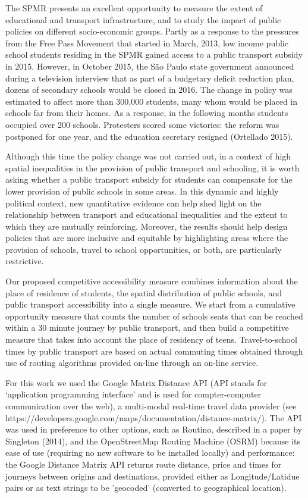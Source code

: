 \documentclass[]{article}
\begin{document}
The SPMR presents an excellent opportunity to measure the extent of
educational and transport infrastructure, and to study the impact of
public policies on different socio-economic groups. Partly as a response
to the pressures from the Free Pass Movement that started in March,
2013, low income public school students residing in the SPMR gained
access to a public transport subsidy in 2015. However, in October 2015,
the São Paulo state government announced during a television interview
that as part of a budgetary deficit reduction plan, dozens of secondary
schools would be closed in 2016. The change in policy was estimated to
affect more than 300,000 students, many whom would be placed in schools
far from their homes. As a response, in the following months students
occupied over 200 schools. Protesters scored some victories: the reform
was postponed for one year, and the education secretary resigned
(Ortellado 2015).

Although this time the policy change was not carried out, in a context
of high spatial inequalities in the provision of public transport and
schooling, it is worth asking whether a public transport subsidy for
students can compensate for the lower provision of public schools in
some areas. In this dynamic and highly political context, new
quantitative evidence can help shed light on the relationship between
transport and educational inequalities and the extent to which they are
mutually reinforcing. Moreover, the results should help design policies
that are more inclusive and equitable by highlighting areas where the
provision of schools, travel to school opportunities, or both, are
particularly restrictive.

Our proposed competitive accessibility measure combines information
about the place of residence of students, the spatial distribution of
public schools, and public transport accessibility into a single
measure. We start from a cumulative opportunity measure that counts the
number of schools seats that can be reached within a 30 minute journey
by public transport, and then build a competitive measure that takes
into account the place of residency of teens. Travel-to-school times by
public transport are based on actual commuting times obtained through
use of routing algorithms provided on-line through an on-line service. 

For this work we used the Google Matrix Distance API
(API stands for `application programming interface' and is used for
compter-computer communication over the web), a multi-modal
real-time travel data provider (see https://developers.google.com/maps/documentation/distance-matrix/). 
The API was used in preference to other options,
such as Routino, described in a paper by Singleton (2014),
and the OpenStreetMap Routing Machine (OSRM)
because its
ease of use (requiring no new software to be installed locally)
and performance: the Google Distance Matrix
API returns
route distance, price and times for journeys between origins and
destinations, provided either as Longitude/Latidue pairs or
as text strings to be 'geocoded' (converted to geographical location).
\end{document}
